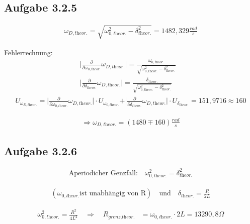 \documentclass[a4paper]{scrartcl}
\numberwithin{equation}{subsection}
\begin{document}
\subsection{Aufgabe 3.2.5}

\begin{align}
\omega_{D,\textit{theor.}} = \sqrt{\omega_{0,\textit{theor.}}^2 - \delta_{\textit{theor.}}^2} = 1482,329 \frac{rad}{s}
\end{align}

Fehlerrechnung:
\begin{align*}
\vert \frac{\partial}{\partial \omega_{0,\textit{theor.}}}\omega_{D,\textit{theor.}}\vert = \frac{\omega_{0,\textit{theor.}}}{\sqrt{\omega_{0,\textit{theor.}}^2 - \delta_{\textit{theor.}}^2}} &\\
\vert \frac{\partial}{\partial \delta_{\textit{theor.}}}\omega_{D,\textit{theor.}}\vert = \frac{\delta_{\textit{theor.}}}{\sqrt{\omega_{0,\textit{theor.}}^2 - \delta_{\textit{theor.}}^2}} &
\end{align*}
\begin{align*}
U_{\omega_{D,\textit{theor.}}} = \vert \frac{\partial}{\partial \omega_{0,\textit{theor.}}}\omega_{D,\textit{theor.}}\vert \cdot U_{\omega_{0,\textit{theor.}}} + \vert \frac{\partial}{\partial \delta_{\textit{theor.}}}\omega_{D,\textit{theor.}}\vert \cdot U_{\delta_{\textit{theor.}}} = 151,9716 \approx 160
\end{align*}

\begin{align*}
\Rightarrow \omega_{D,\textit{theor.}} = (1480 \mp 160) \frac{rad}{s}
\end{align*}

\subsection{Aufgabe 3.2.6}

\begin{align}
\text{Aperiodicher Genzfall:} \quad \omega_{0,\textit{theor.}}^2 = \delta_{\textit{theor.}}^2
\end{align}

\begin{align*}
(\omega_{0,\textit{theor.}} \text{ist unabhängig von R}) \quad \text{und} \quad
\delta_{\textit{theor.}} = \frac{R}{2L}
\end{align*}

\begin{align}
\omega_{0,\textit{theor.}}^2 = \frac{R^2}{4L^2} \quad \Rightarrow \quad R_{\textit{grenz,theor.}} &= \omega_{0,\textit{theor.}} \cdot 2L = 13290,8 \Omega
\end{align}
\end{document}
